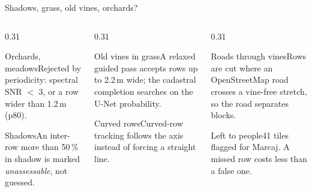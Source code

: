 \begin{frame}{Shadows, grass, old vines, orchards?}
  \begin{columns}[T]
    \begin{column}{0.31\textwidth}
      \begin{sxcard}{Orchards, meadows}Rejected by periodicity: spectral SNR $<$ 3, or a row wider than 1.2\,m (p80).\end{sxcard}
      \par\vspace{2.5mm}
      \begin{sxcard}{Shadows}An inter-row more than 50\,\% in shadow is marked \emph{unassessable}, not guessed.\end{sxcard}
    \end{column}
    \begin{column}{0.31\textwidth}
      \begin{sxcard}{Old vines in grass}A relaxed guided pass accepts rows up to 2.2\,m wide; the cadastral completion searches on the U-Net probability.\end{sxcard}
      \par\vspace{2.5mm}
      \begin{sxcard}{Curved rows}Curved-row tracking follows the axis instead of forcing a straight line.\end{sxcard}
    \end{column}
    \begin{column}{0.31\textwidth}
      \begin{sxcard}{Roads through vines}Rows are cut where an OpenStreetMap road crosses a vine-free stretch, so the road separates blocks.\end{sxcard}
      \par\vspace{2.5mm}
      \begin{sxcard}{Left to people}41 tiles flagged for Marcaj. A missed row costs less than a false one.\end{sxcard}
    \end{column}
  \end{columns}
\end{frame}


